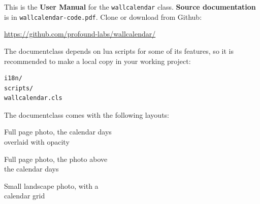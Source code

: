 \bigskip

\thispagestyle{empty}

This is the \textbf{User Manual} for the \texttt{wallcalendar} class.
\textbf{Source documentation} is in \texttt{wallcalendar-code.pdf}. Clone or
download from Github:

\href{https://github.com/profound-labs/wallcalendar/}{https://github.com/profound-labs/wallcalendar/}

The documentclass depends on lua scripts for some of its features, so it is
recommended to make a local copy in your working project:

\begin{verbatim}
i18n/
scripts/
wallcalendar.cls
\end{verbatim}

The documentclass comes with the following layouts:

\bigskip

\makeatletter
\newlength\exampleWidth
\setlength{\exampleWidth}{45mm}
\makeatother

\begin{extrafullwidth}

\hfill
\begin{minipage}{0.31\linewidth}
\centering

Full page photo, the calendar days\\
overlaid with opacity

\bigskip


\end{minipage}%
\begin{minipage}{0.31\linewidth}
\centering

Full page photo, the photo above\\
the calendar days

\bigskip


\end{minipage}%
\begin{minipage}{0.31\linewidth}
\centering

Small landscape photo, with a\\
calendar grid

\bigskip


\end{minipage}
\hfill\mbox{}

\end{extrafullwidth}

